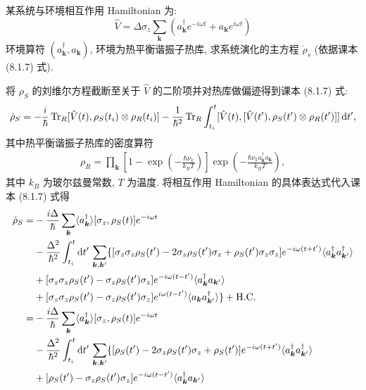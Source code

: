 \documentclass{assignment}
\begin{document}
\begin{prob}
    某系统与环境相互作用 Hamiltonian 为:
    \[
        \hat{V}=\Delta\sigma_z\sum_{\bm{k}}(a_{\bm{k}}^{\dagger}e^{-i\omega t}+a_{\bm{k}}e^{i\omega t})
    \]
    环境算符 $(a_{\bm{k}}^{\dagger},a_{\bm{k}})$, 环境为热平衡谐振子热库, 求系统演化的主方程 $\dot{\rho}_s$ (依据课本 (8.1.7) 式).
\end{prob}
\begin{sol}
    将 $\rho_S$ 的刘维尔方程截断至关于 $\hat{V}$ 的二阶项并对热库做偏迹得到课本 (8.1.7) 式:
    \begin{align}
        \dot{\rho}_S=-\frac{i}{\hbar}\operatorname{Tr}_R[\hat{V}(t),\rho_S(t_i)\otimes\rho_R(t_i)]-\frac{1}{\hbar^2}\operatorname{Tr}_R\int_{t_i}^t[\hat{V}(t),[\hat{V}(t'),\rho_S(t')\otimes\rho_R(t')]]\,\mathrm{d}t',
    \end{align}
    其中热平衡谐振子热库的密度算符
    \begin{align}
        \rho_R=\prod_{\bm{k}}\left[1-\exp\left(-\frac{\hbar\nu_k}{k_BT}\right)\right]\exp\left(-\frac{\hbar\nu_ka_{\bm{k}}^{\dagger}a_{\bm{k}}}{k_BT}\right),
    \end{align}
    其中 $k_B$ 为玻尔兹曼常数, $T$ 为温度.
    将相互作用 Hamiltonian 的具体表达式代入课本 (8.1.7) 式得
    \begin{align}
        \notag\dot{\rho}_S=&-\frac{i\Delta}{\hbar}\sum_{\bm{k}}\langle a_{\bm{k}}^{\dagger}\rangle[\sigma_z,\rho_S(t)]e^{-i\omega t}\\
        \notag&-\frac{\Delta^2}{\hbar^2}\int_{t_i}^t\mathrm{d}t'\,\sum_{\bm{k},\bm{k}'}\{[\sigma_z\sigma_z\rho_S(t')-2\sigma_z\rho_S(t')\sigma_z+\rho_S(t')\sigma_z\sigma_z]e^{-i\omega(t+t')}\langle a_{\bm{k}}^{\dagger}a_{\bm{k}'}^{\dagger}\rangle\\
        \notag&+[\sigma_z\sigma_z\rho_S(t')-\sigma_z\rho_S(t')\sigma_z]e^{-i\omega(t-t')}\langle a_{\bm{k}}^{\dagger}a_{\bm{k}'}\rangle\\
        \notag&+[\sigma_z\sigma_z\rho_S(t')-\sigma_z\rho_S(t')\sigma_z]e^{i\omega(t-t')}\langle a_{\bm{k}}a_{\bm{k}'}^{\dagger}\rangle\}+\text{H.C.}\\
        \notag=&-\frac{i\Delta}{\hbar}\sum_{\bm{k}}\langle a_{\bm{k}}^{\dagger}\rangle[\sigma_z,\rho_S(t)]e^{-i\omega t}\\
        \notag&-\frac{\Delta^2}{\hbar^2}\int_{t_i}^t\mathrm{d}t'\,\sum_{\bm{k},\bm{k}'}\{[\rho_S(t')-2\sigma_z\rho_S(t')\sigma_z+\rho_S(t')]e^{-i\omega(t+t')}\langle a_{\bm{k}}^{\dagger}a_{\bm{k}'}^{\dagger}\rangle\\
        \notag&+[\rho_S(t')-\sigma_z\rho_S(t')\sigma_z]e^{-i\omega(t-t')}\langle a_{\bm{k}}^{\dagger}a_{\bm{k}'}\rangle\\

\end{align}
\end{sol}
\end{document}

